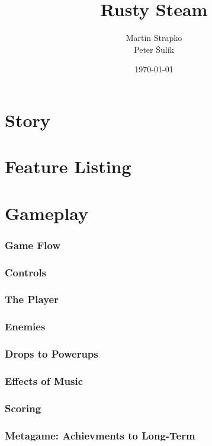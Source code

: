\documentclass[a4paper]{report}
\title{Rusty Steam}
\author{Martin Strapko \\ Peter Šulík}
\date{\today}
\begin{document}
\maketitle

\tableofcontents
 
\part{Story}
 
\part{Feature Listing}
 
\part{Gameplay}
\section{Game Flow}
 
\section{Controls}
 
\section{The Player}
 
\section{Enemies}
 
\section{Drops to Powerups}
 
\section{Effects of Music}
 
\section{Scoring}
 
\section{Metagame: Achievments to Long-Term}
 
\end{document}
